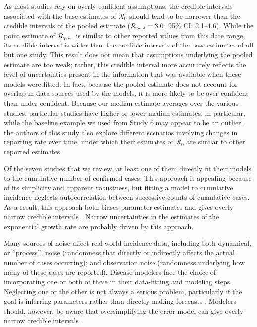 \documentclass[12pt]{article}
\newcommand{\Ro}{\ensuremath{{\mathcal R}_{0}}\xspace}
\newcommand{\Rpool}{\ensuremath{{\mathcal R}_{\textrm{\tiny{pool}}}}\xspace}
\begin{document}
As most studies rely on overly confident assumptions, the credible intervals associated with the base estimates of \Ro should tend to be narrower than the credible intervals of the pooled estimate ($\Rpool = 3.0$; 95\% CI: 2.1--4.6).
While the point estimate of \Rpool is similar to other reported values from this date range, its credible interval is wider than the credible intervals of the base estimates of all but one study.
This result does not mean that assumptions underlying the pooled estimate are too weak;
rather, this credible interval more accurately reflects the level of uncertainties present in the information that was available when these models were fitted.
In fact, because the pooled estimate does not account for overlap in data sources used by the models, it is more likely to be over-confident than under-confident.
Because our median estimate averages over the various studies, particular studies have higher or lower median estimates.
In particular, while the baseline example we used from Study 6 may appear to be an outlier, the authors of this study also explore different scenarios involving changes in reporting rate over time, under which their estimates of \Ro are similar to other reported estimates.

Of the seven studies that we review, at least one of them directly fit their models to the cumulative number of confirmed cases.
This approach is appealing because of its simplicity and apparent robustness, but fitting a model to cumulative incidence neglects autocorrelation between successive counts of cumulative cases. 
As a result, this approach both biases parameter estimates and gives overly narrow credible intervals \citep{ma2014estimating, king2015avoidable}.
Narrow uncertainties in the estimates of the exponential growth rate are probably driven by this approach.

Many sources of noise affect real-world incidence data, including both dynamical, or ``process'', noise (randomness that directly or indirectly affects the actual number of cases occurring); and observation noise (randomness underlying how many of these cases are reported).  
Disease modelers face the choice of incorporating one or both of these in their data-fitting and modeling steps. 
Neglecting one or the other is not always a serious problem, particularly if the goal is inferring parameters rather than directly making forecasts \citep{ma2014estimating}.
Modelers should, however, be aware that oversimplifying the error model can give overly narrow credible intervals \citep{king2015avoidable,taylor2016stochasticity}.
\end{document}
